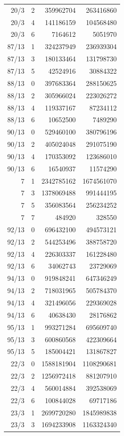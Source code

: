 \begin{longtable}{@{}rrrr@{}}
20/3 & 2 & 359962704 & 263416860\\
20/3 & 4 & 141186159 & 104568480\\
20/3 & 6 & 7164612 & 5051970\\
87/13 & 1 & 324237949 & 236939304\\
87/13 & 3 & 180133464 & 131798730\\
87/13 & 5 & 42524916 & 30884322\\
88/13 & 0 & 397683364 & 288150625\\
88/13 & 2 & 305966024 & 223026272\\
88/13 & 4 & 119337167 & 87234112\\
88/13 & 6 & 10652500 & 7489290\\
90/13 & 0 & 529460100 & 380796196\\
90/13 & 2 & 405024048 & 291075190\\
90/13 & 4 & 170353092 & 123686010\\
90/13 & 6 & 16540937 & 11574290\\
7 & 1 & 2342785162 & 1674561070\\
7 & 3 & 1378069488 & 991444195\\
7 & 5 & 356083564 & 256234252\\
7 & 7 & 484920 & 328550\\
92/13 & 0 & 696432100 & 494573121\\
92/13 & 2 & 544253496 & 388758720\\
92/13 & 4 & 226303337 & 161228480\\
92/13 & 6 & 34062743 & 23729069\\
94/13 & 0 & 919848241 & 647346249\\
94/13 & 2 & 718031965 & 505784370\\
94/13 & 4 & 321496056 & 229369028\\
94/13 & 6 & 40638430 & 28176862\\
95/13 & 1 & 993271284 & 695609740\\
95/13 & 3 & 600860568 & 422309664\\
95/13 & 5 & 185004421 & 131867827\\
22/3 & 0 & 1588181904 & 1108290681\\
22/3 & 2 & 1256972418 & 881207910\\
22/3 & 4 & 560014884 & 392538069\\
22/3 & 6 & 100844028 & 69717186\\
23/3 & 1 & 2699720280 & 1845989838\\
23/3 & 3 & 1694233908 & 1163324340\\

\end{longtable}
